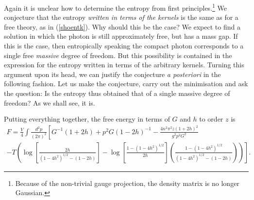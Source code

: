 \documentclass[a4paper,a4paper]{article}
\begin{document}
Again it is unclear how to determine the entropy from first principles.\footnote{Because of the non-trivial gauge projection,
the density matrix is no longer Gaussian.} 
We conjecture that the entropy \emph{written in terms of the kernels}
is the same as for a free  theory, as in (\ref{shoentk}). Why should this be the case? We expect to find a solution
in which the photon is still approximately free, but has a mass gap. If this is the case,
then entropically speaking the compact photon corresponds to a single free \emph{massive} degree of freedom.
But this possibility is contained in the expression for the entropy written in terms of the arbitrary kernels. 
Turning this argument upon its head, we can justify the conjecture \emph{a posteriori} in the following fashion.
Let us make the conjecture, carry out the minimisation and ask the question:
Is the entropy thus obtained that of a single massive degree of freedom? As we shall see, it is.

Putting everything together, the free energy in terms of $G$ and $h$ to order $z$ is
\begin{multline}
F = \frac{V}{4} \int \frac{d^2p}{(2\pi)^2} 
\left[  G^{-1}(1 +2h) + p^2 G (1 -2h)^{-1} 
- \frac{4 n^2 \pi^2 z (1+2h)^2}{g^2 p^2 G^2} \right. \\
\left. - T \left(  \log \left[ \frac{2h}{  (1-4h^2)^{1/2} - (1-2h)}\right] 
- \log \left[ \frac{1- (1-4h^2)^{1/2}}{2h}\right] \left( \frac{1- (1-4h^2)^{1/2}}{(1-4h^2)^{1/2}-(1-2h)} \right) \right) \right].
\end{multline}
\end{document}
